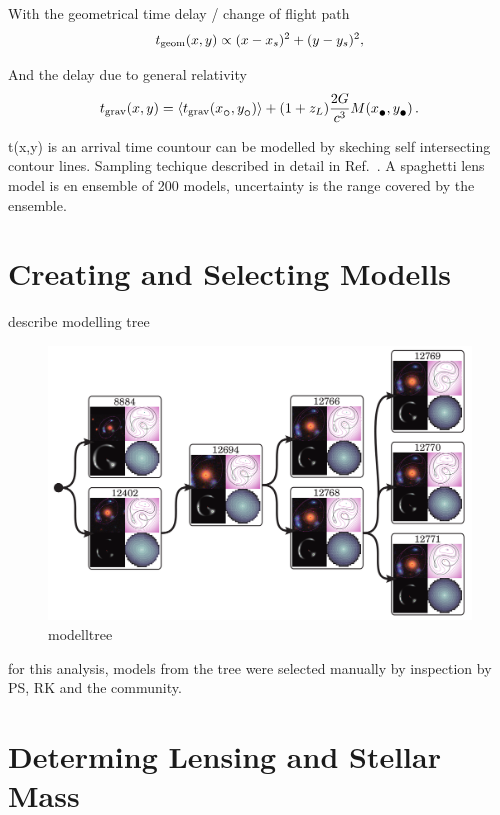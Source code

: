 \documentclass{ws-procs975x65}
\newcommand{\icite}[1]{Ref.~\refcite{#1}} %
\newcommand{\tgeom}{t_{\rm geom}}
\newcommand{\tgrav}{t_{\rm grav}}
\newcommand{\subcirc}{{\lower.33ex\hbox{$\circ$}}}
\newcommand{\subbullet}{{\lower.33ex\hbox{$\bullet$}}}
\begin{document}
With the geometrical time delay / change of flight path
\begin{equation} \label{eq:tgeom}
\tgeom(x,y) \propto (x-x_s)^2 + (y-y_s)^2 ,
\end{equation}

And the delay due to general relativity
\begin{equation} \label{eq:tgrav}
\tgrav(x,y) = \left\langle \tgrav(x_\subcirc,y_\subcirc) \right\rangle
              + (1+z_L) \frac{2G}{c^3} M(x_\subbullet,y_\subbullet) \,.
\end{equation}

t(x,y) is an arrival time countour
can be modelled by skeching self intersecting contour lines.
Sampling techique described in detail in \icite{Lubini2012}.
A spaghetti lens model is en ensemble of 200 models, uncertainty is the range covered by the ensemble.




\section{Creating and Selecting Modells}

describe modelling tree

\begin{figure}
  \centering
  \includegraphics[width=0.8\columnwidth]{img/modeltree}
  \caption{
    modelltree
  }
  \label{fig:tree}
\end{figure}

for this analysis, models from the tree were selected manually by inspection by PS, RK and the community.


\section{Determing Lensing and Stellar Mass}
\end{document}
